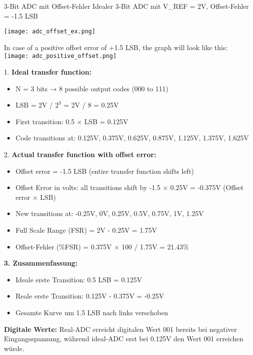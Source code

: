 \begin{example2}{3-Bit ADC mit Offset-Fehler}
    Idealer 3-Bit ADC mit V\_REF = 2V, Offset-Fehler = -1.5 LSB
    
    \tcblower

    \begin{minipage}{0.5\linewidth}
    \texttt{[image: adc\_offset\_ex.png]}
    \end{minipage}
    \begin{minipage}{0.5\linewidth}
        In case of a positive offset error of +1.5 LSB, the graph will look like this:\\
        \texttt{[image: adc\_positive\_offset.png]}
    \end{minipage}

    1. \textbf{Ideal transfer function:}
    \begin{itemize}
        \item N = 3 bits → 8 possible output codes (000 to 111)
        \item LSB = 2V / $2^3$ = 2V / 8 = 0.25V
        \item First transition: 0.5 × LSB = 0.125V
        \item Code transitions at: 0.125V, 0.375V, 0.625V, 0.875V, 1.125V, 1.375V, 1.625V
    \end{itemize}

    2. \textbf{Actual transfer function with offset error:}
    \begin{itemize}
        \item Offset error = -1.5 LSB (entire transfer function shifts left)
        \item Offset Error in volts: all transitions shift by -1.5 × 0.25V = -0.375V (Offset error $\times$ LSB)
        \item New transitions at: -0.25V, 0V, 0.25V, 0.5V, 0.75V, 1V, 1.25V
        \item Full Scale Range (FSR) = 2V - 0.25V = 1.75V
        \item Offset-Fehler (\%FSR) = 0.375V $\times$ 100 / 1.75V = 21.43\%
    \end{itemize}

    
    \textbf{3. Zusammenfassung:}
    \begin{itemize}
        \item Ideale erste Transition: 0.5 LSB = 0.125V
        \item Reale erste Transition: 0.125V - 0.375V = -0.25V
        \item Gesamte Kurve um 1.5 LSB nach links verschoben
    \end{itemize}
    
    \textbf{Digitale Werte:}
    Real-ADC erreicht digitalen Wert 001 bereits bei negativer Eingangsspannung, während ideal-ADC erst bei 0.125V den Wert 001 erreichen würde.
\end{example2}

